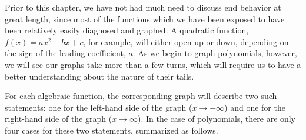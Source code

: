 \documentclass[12pt]{book}
\theoremstyle{definition}
\begin{document}
Prior to this chapter, we have not had much need to discuss end behavior at great length, since most of the functions which we have been exposed to have been relatively easily diagnosed and graphed.  A quadratic function, $f(x)=ax^2+bx+c$, for example, will either open up or down, depending on the sign of the leading coefficient, $a$.  As we begin to graph polynomials, however, we will see our graphs take more than a few turns, which will require us to have a better understanding about the nature of their tails.
\par
For each algebraic function, the corresponding graph will describe two such statements: one for the left-hand side of the graph ($x\rightarrow -\infty$) and one for the right-hand side of the graph ($x\rightarrow\infty$).  In the case of polynomials, there are only four cases for these two statements, summarized as follows.\par
\end{document}
